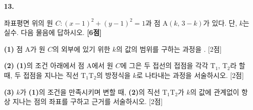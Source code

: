 \documentclass[10pt]{article}
\renewenvironment{problem}[2]{%
  \par%
  \setcounter{probnum}{#1}%
  \noindent
  \begin{minipage}[t]{\linewidth}%
  \setlength{\parskip}{4pt plus 1pt}%
  {\sffamily\bfseries\large\color{black}#1.}\par\smallskip\ignorespaces
}{%
  \end{minipage}\par%
}
\newcommand{\pts}[1]{\nobreak\hspace*{\fill}\textbf{[#1점]}\par}
\begin{document}
\clearpage

\setlength{\probboxheight}{195mm}

\noindent
\begin{minipage}[t][\probboxheight][t]{0.46\linewidth}\raggedright
\begin{problem}{13}{s}
좌표평면 위의 원 $C: (x-1)^{2}+(y-1)^{2}=1$과 점 $\mathrm{A}(k,\,3-k)$가 있다. 단, $k$는 실수. 다음 물음에 답하시오. \pts{6}

\vspace{2mm}

\textbf{(1)} 점 $\mathrm{A}$가 원 $C$의 외부에 있기 위한 $k$의 값의 범위를 구하는 과정을 . \nolinebreak\hspace*{\fill}\mbox{[2점]}
\vspace{40mm}

\textbf{(2)} \textbf{(1)}의 조건 아래에서 점 $\mathrm{A}$에서 원 $C$에 그은 두 접선의 접점을 각각 $\mathrm{T_1}$, $\mathrm{T_2}$라 할 때, 두 접점을 지나는 직선 $\mathrm{T_1T_2}$의 방정식을 $k$로 나타내는 과정을 서술하시오. \nolinebreak\hspace*{\fill}\mbox{[2점]}
\vspace{40mm}

\textbf{(3)} $k$가 \textbf{(1)}의 조건을 만족시키며 변할 때, \textbf{(2)}의 직선 $\mathrm{T_1T_2}$가 $k$의 값에 관계없이 항상 지나는 점의 좌표를 구하고 근거를 서술하시오. \nolinebreak\hspace*{\fill}\mbox{[2점]}
\vspace{35mm}
\end{problem}
\end{minipage}%
\hfill
\end{document}
